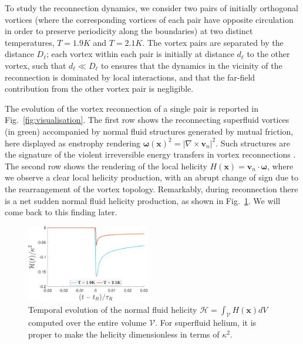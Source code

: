 \documentclass[%
 reprint,
 amsmath,amssymb,
 aps,
 prl,
]{revtex4-2}
\newcommand{\bom}{\boldsymbol{\omega}}
\def \v{\mathbf{v}}
\def \x{\mathbf{x}}
\begin{document}
{To study the reconnection dynamics, we consider two pairs of initially orthogonal vortices (where the corresponding vortices of each pair have opposite circulation in order to preserve periodicity along the boundaries)
at two distinct temperatures, $T=1.9K$ and $T=2.1K$. The vortex pairs are separated by the distance $D_{\ell}$; each vortex within each pair is initially at distance $d_{\ell}$ to the other vortex, such that $d_{\ell}\ll D_{\ell}$ to ensures that the dynamics in the vicinity of the reconnection is dominated by local interactions, and that the far-field contribution from the other vortex pair is negligible.

The evolution of the vortex reconnection of a single pair is reported in Fig.~\ref{fig:visualisation}. 
The first row shows the reconnecting superfluid vortices (in green) accompanied by normal fluid structures generated by mutual friction, here displayed as enstrophy rendering $\bom(\x)^2=|\nabla\times \v_n|^2$. Such structures are the signature of the violent irreversible energy transfers in vortex reconnections 
\cite{stasiak2024quantum}. The second row shows the rendering of the local helicity $H(\x)=\v_n\cdot\bom$, where we observe a clear local helicity production, with an abrupt change of sign due to the rearrangement of the vortex topology. Remarkably, during reconnection there is a net 
sudden normal fluid helicity production, as shown in Fig.~\ref{fig:total-helicity}. We will come back to this finding later.
\begin{figure}[t]
    \centering
    \includegraphics*[width=0.48\textwidth]{helicity_total.pdf}
\caption{Temporal evolution of the normal fluid helicity $\mathcal{H} = \int_{\mathcal{V}}H(\x)dV$ computed over the entire volume $\mathcal{V}$. For superfluid helium, it is proper to make the helicity dimensionless in terms of $\kappa^2$.}
\label{fig:total-helicity}
\end{figure}

}
\end{document}

